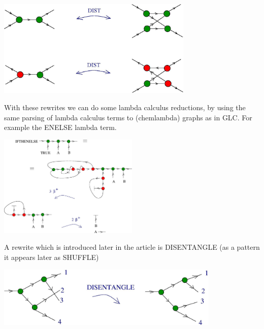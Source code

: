 \documentclass{article}
\begin{document}
\centerline{\includegraphics[width=0.7\textwidth]{../img/chemical-concrete-machine/convention_6.jpg}
}
\vspace{.5cm}

With these rewrites we can do some lambda calculus reductions, by using the same parsing of lambda calculus terms to (chemlambda) graphs as in GLC. For example the ENELSE lambda term.



\vspace{.5cm}
 
\centerline{\includegraphics[width=0.5\textwidth]{../img/chemical-concrete-machine/bckw_112.jpg}
}
\vspace{.5cm}


A rewrite which is introduced later in the article is DISENTANGLE  (as a pattern it appears later as SHUFFLE)



\vspace{.5cm}

\vspace{.5cm}
 
\centerline{\includegraphics[width=0.8\textwidth]{../img/chemical-concrete-machine/bckw_5.jpg}
}
\vspace{.5cm}
\end{document}
